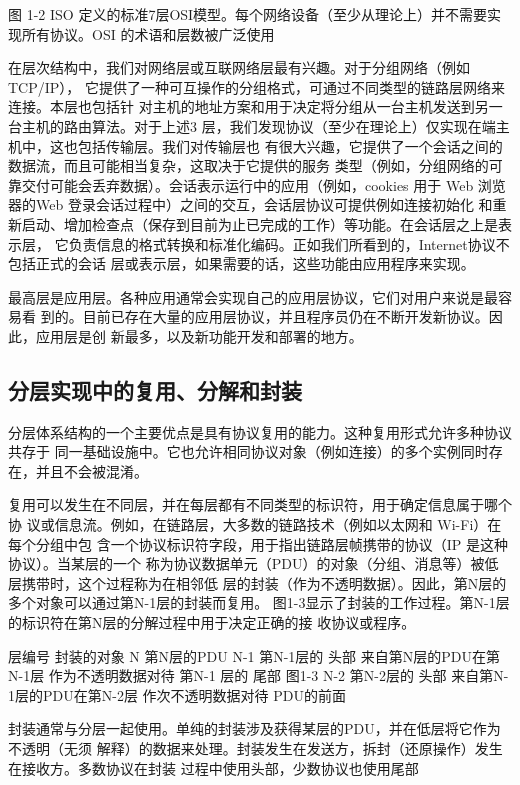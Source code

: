 图 1-2
ISO 定义的标准7层OSI模型。每个网络设备（至少从理论上）并不需要实现所有协议。OSI
的术语和层数被广泛使用

在层次结构中，我们对网络层或互联网络层最有兴趣。对于分组网络（例如 TCP/IP），
它提供了一种可互操作的分组格式，可通过不同类型的链路层网络来连接。本层也包括针
对主机的地址方案和用于决定将分组从一台主机发送到另一台主机的路由算法。对于上述3
层，我们发现协议（至少在理论上）仅实现在端主机中，这也包括传输层。我们对传输层也
有很大兴趣，它提供了一个会话之间的数据流，而且可能相当复杂，这取决于它提供的服务
类型（例如，分组网络的可靠交付可能会丢弃数据）。会话表示运行中的应用（例如，cookies
用于 Web 浏览器的Web 登录会话过程中）之间的交互，会话层协议可提供例如连接初始化
和重新启动、增加检查点（保存到目前为止已完成的工作）等功能。在会话层之上是表示层，
它负责信息的格式转换和标准化编码。正如我们所看到的，Internet协议不包括正式的会话
层或表示层，如果需要的话，这些功能由应用程序来实现。

最高层是应用层。各种应用通常会实现自己的应用层协议，它们对用户来说是最容易看
到的。目前已存在大量的应用层协议，并且程序员仍在不断开发新协议。因此，应用层是创
新最多，以及新功能开发和部署的地方。

\subsection{分层实现中的复用、分解和封装}
分层体系结构的一个主要优点是具有协议复用的能力。这种复用形式允许多种协议共存于
同一基础设施中。它也允许相同协议对象（例如连接）的多个实例同时存在，并且不会被混淆。

复用可以发生在不同层，并在每层都有不同类型的标识符，用于确定信息属于哪个协
议或信息流。例如，在链路层，大多数的链路技术（例如以太网和 Wi-Fi）在每个分组中包
含一个协议标识符字段，用于指出链路层帧携带的协议（IP 是这种协议）。当某层的一个
称为协议数据单元（PDU）的对象（分组、消息等）被低层携带时，这个过程称为在相邻低
层的封装（作为不透明数据）。因此，第N层的多个对象可以通过第N-1层的封装而复用。
图1-3显示了封装的工作过程。第N-1层的标识符在第N层的分解过程中用于决定正确的接
收协议或程序。

层编号
封装的对象
N
第N层的PDU
N-1
第N-1层的
头部
来自第N层的PDU在第N-1层
作为不透明数据对待
第N-1
层的
尾部
图1-3
N-2
第N-2层的
头部
来自第N-1层的PDU在第N-2层
作次不透明数据对待
PDU的前面

封装通常与分层一起使用。单纯的封装涉及获得某层的PDU，并在低层将它作为不透明（无须
解释）的数据来处理。封装发生在发送方，拆封（还原操作）发生在接收方。多数协议在封装
过程中使用头部，少数协议也使用尾部

